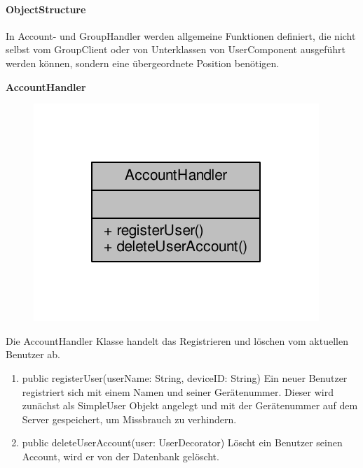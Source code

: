 	

\paragraph{ObjectStructure}

In Account- und GroupHandler werden allgemeine Funktionen definiert, die nicht selbst vom GroupClient oder von Unterklassen von UserComponent ausgeführt werden können, sondern eine übergeordnete Position benötigen.

\textbf{AccountHandler}
\begin{figure}[H]
	\includegraphics[scale = 1]{res/umlClasses/account_handler__coll__graph.pdf}
	\centering
\end{figure}
Die AccountHandler Klasse handelt das Registrieren und löschen vom aktuellen Benutzer ab.
\begin{enumerate}
	\item public registerUser(userName: String, deviceID: String)
		Ein neuer Benutzer registriert sich mit einem Namen und seiner Gerätenummer. Dieser wird zunächst als SimpleUser Objekt angelegt und mit der Gerätenummer auf dem Server gespeichert, um Missbrauch zu verhindern.
	\item public deleteUserAccount(user: UserDecorator)
		Löscht ein Benutzer seinen Account, wird er von der Datenbank gelöscht.
\end{enumerate}

